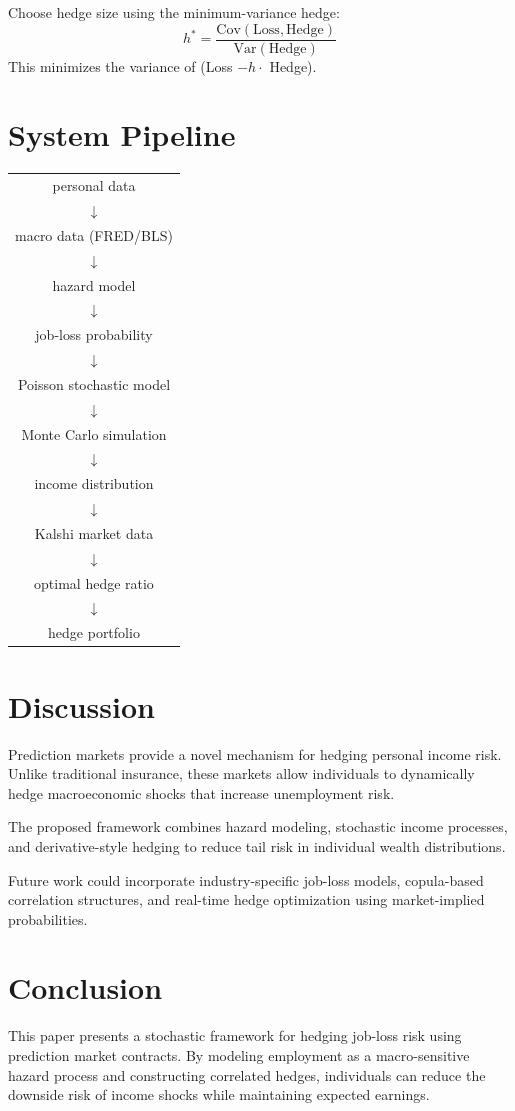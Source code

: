 \documentclass[11pt]{article}
\begin{document}
Choose hedge size using the minimum-variance hedge:
\[
h^* = \frac{\text{Cov}(\text{Loss}, \text{Hedge})}{\text{Var}(\text{Hedge})}
\]
This minimizes the variance of (Loss $- h \cdot$ Hedge).

\section{System Pipeline}

\begin{center}
\begin{tabular}{c}
personal data \\
$\downarrow$ \\
macro data (FRED/BLS) \\
$\downarrow$ \\
hazard model \\
$\downarrow$ \\
job-loss probability \\
$\downarrow$ \\
Poisson stochastic model \\
$\downarrow$ \\
Monte Carlo simulation \\
$\downarrow$ \\
income distribution \\
$\downarrow$ \\
Kalshi market data \\
$\downarrow$ \\
optimal hedge ratio \\
$\downarrow$ \\
hedge portfolio
\end{tabular}
\end{center}

\section{Discussion}

Prediction markets provide a novel mechanism for hedging personal income risk. 
Unlike traditional insurance, these markets allow individuals to dynamically 
hedge macroeconomic shocks that increase unemployment risk.

The proposed framework combines hazard modeling, stochastic income processes, 
and derivative-style hedging to reduce tail risk in individual wealth 
distributions.

Future work could incorporate industry-specific job-loss models, copula-based 
correlation structures, and real-time hedge optimization using market-implied 
probabilities.

\section{Conclusion}

This paper presents a stochastic framework for hedging job-loss risk using 
prediction market contracts. By modeling employment as a macro-sensitive hazard 
process and constructing correlated hedges, individuals can reduce the downside 
risk of income shocks while maintaining expected earnings.
\end{document}
